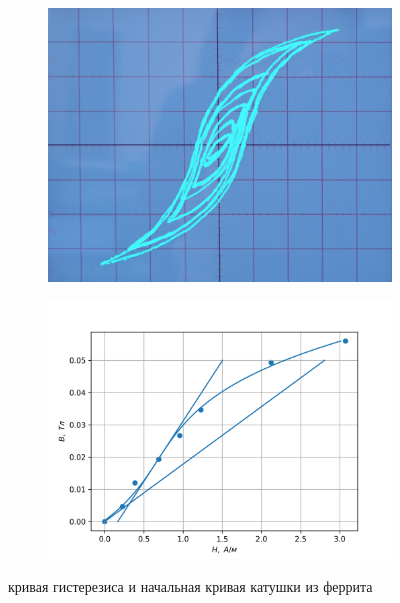 \documentclass[14pt, a4paper]{report}
\begin{document}
\begin{figure}
	\centering
	\begin{subfigure}{.5\textwidth}
		\centering
		\includegraphics[width=\linewidth]{images/345_5.png}
	\end{subfigure}%
	\begin{subfigure}{.5\textwidth}
		\centering
		\includegraphics[width=\linewidth]{images/345_2.png}
	\end{subfigure}
	\caption{кривая гистерезиса и начальная кривая катушки из феррита}
\end{figure}
\end{document}
